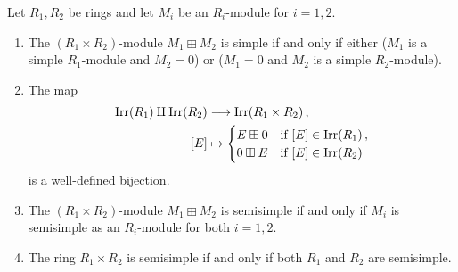 \begin{proposition}
  \label{proposition: product of semisimple}
  Let $R_1, R_2$ be rings and let $M_i$ be an $R_i$-module for $i = 1, 2$.
  \begin{enumerate}
    \item
      \label{enumerate: when boxplus is simple}
      The $(R_1 \times R_2)$-module $M_1 \boxplus M_2$ is simple if and only if either ($M_1$ is a simple $R_1$-module and $M_2 = 0$) or ($M_1 = 0$ and $M_2$ is a simple $R_2$-module).
    \item
      The map
      \begin{align*}
                  \operatorname{Irr}(R_1) \amalg \operatorname{Irr}(R_2)
        &\longrightarrow  \operatorname{Irr}(R_1 \times R_2) \,,
        \\
                  [E]
        &\mapsto  \begin{cases}
                    E \boxplus 0  & \text{if $[E] \in \operatorname{Irr}(R_1)$} \,, \\
                    0 \boxplus E  & \text{if $[E] \in \operatorname{Irr}(R_2)$}
                  \end{cases}
      \end{align*}
      is a well-defined bijection.
    \item
      \label{enumerate: when boxplus is semisimple}
      The $(R_1 \times R_2)$-module $M_1 \boxplus M_2$ is semisimple if and only if $M_i$ is semisimple as an $R_i$-module for both $i = 1, 2$.
    \item
      The ring $R_1 \times R_2$ is semisimple if and only if both $R_1$ and $R_2$ are semisimple.
  \end{enumerate}
\end{proposition}


